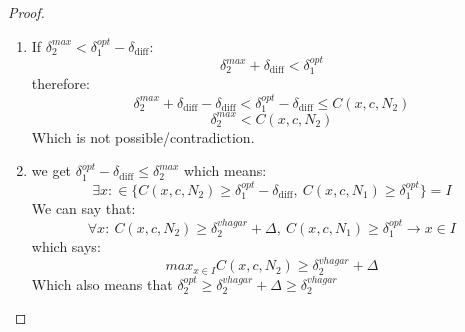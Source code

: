\begin{proof}
\begin{enumerate}
    \begin{enumerate}
    \item If $\delta_2^{max} < \delta_1^{opt} - \delta_\text{diff}$:
    $$ \delta_2^{max}+\delta_\text{diff} < \delta_1^{opt}$$
    therefore:
    $$ \delta_2^{max}+\delta_\text{diff} - \delta_{\text{diff}}< \delta_1^{opt}-\delta_{\text{diff}} \leq C(x,c,N_2) $$
    $$ \delta_2^{max} < C(x,c,N_2) $$
    Which is not possible/contradiction.
    
    \item we get $\delta_1^{opt}-\delta_{\text{diff}} \leq \delta_2^{max}$ which means:
    $$ \exists{x}:\in \{C(x,c,N_2) \geq \delta_1^{opt}-\delta_\text{diff},\ C(x,c,N_1) \geq \delta_1^{opt}\} = I $$
    We can say that:
    $$\forall{x}:\ C(x,c,N_2)\geq \delta_2^{vhagar}+\Delta,\ C(x,c,N_1) \geq \delta_1^{opt} \rightarrow x\in{I}$$
    which says:
    $$ max_{x\in{I}}{C(x,c,N_2)} \geq \delta_2^{vhagar}+\Delta $$
    Which also means that $\delta_2^{opt} \geq \delta_2^{vhagar}+\Delta \geq \delta_2^{vhagar}$
    
    \end{enumerate} 
    
\end{enumerate} 



\begin{comment}
Let's examine the following optimization problem:
$$ max_x{\delta_\text{diff}}:\ 0 \leq |C(x,c,N_2)-C(x,c,N_1)|=\delta_\text{diff} $$
Which means that $\forall{x}:\ |C(x,c,N_2)-C(x,c,N_1)| \leq \delta_\text{diff}$.\\ \\
If $\delta_\text{diff}=0$ it means that $\forall{x}:\ |C(x,c,N_2)-C(x,c,N_1)|=0$, and specifically $\delta_1^{opt}=\delta_2^{opt}$. From previous lemma we can say $\delta_1^{opt} \geq \delta^{vhagar}_1$, so in that case, $\delta_2^{opt} \geq \delta^{vhagar}_1$. because of $\forall{x}:\ |C(x,c,N_2)-C(x,c,N_1)|=0$, we can say $\delta^{vhagar}_1=\delta^{vhagar}_2$ (otherwise it contradicts vaghar or the equality of the confidence-diff to 0). therefore: $\delta_2^{opt} \geq \delta^{vhagar}_2$ when $\delta_\text{diff}=0$.\\
We shall use the following notion: when $\delta_\text{diff}=0: \delta'=\delta_2^{opt}$ \\ \\
If $\delta_\text{diff}>0$: since $\forall{x}:\ |C(x,c,N_2)-C(x,c,N_1)| \leq \delta_\text{diff}$ it also happens:  
$$\forall{x}\in{\{x| C(x,c,N_2)\geq{\delta'},\ C(x,c,N_1)\leq{\delta_1^{opt}}\}}: |C(x,c,N_2)-C(x,c,N_1)| \leq \delta_\text{diff}$$


\end{comment}
\end{proof}
